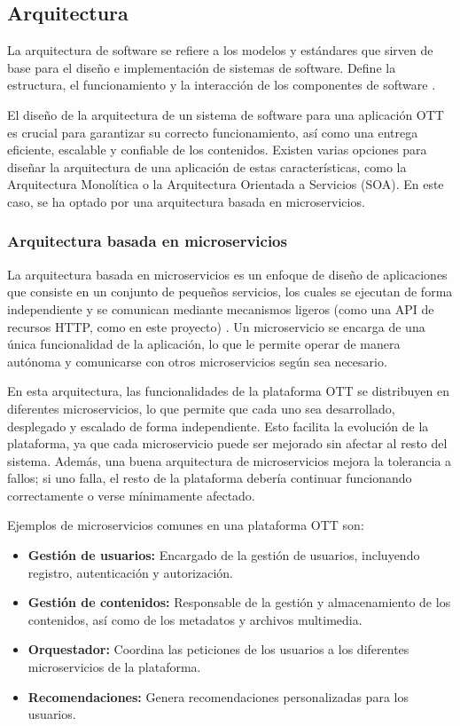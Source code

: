 \subsection{Arquitectura}
\label{subsec:fundamentos_teoricos_arquitectura}

La arquitectura de software se refiere a los modelos y estándares que sirven de base para el diseño e 
implementación de sistemas de software. Define la estructura, el funcionamiento y la interacción de los 
componentes de software \cite{ArqSoftware}.

El diseño de la arquitectura de un sistema de software para una aplicación OTT es crucial para garantizar 
su correcto funcionamiento, así como una entrega eficiente, escalable y confiable de los contenidos. 
Existen varias opciones para diseñar la arquitectura de una aplicación de estas características, como 
la Arquitectura Monolítica o la Arquitectura Orientada a Servicios (SOA). En este caso, se ha optado por 
una arquitectura basada en microservicios.

\subsubsection{Arquitectura basada en microservicios}
\label{subsec:fundamentos_teoricos_arquitectura_microservicios}

La arquitectura basada en microservicios es un enfoque de diseño de aplicaciones que consiste en un conjunto 
de pequeños servicios, los cuales se ejecutan de forma independiente y se comunican mediante mecanismos 
ligeros (como una API de recursos HTTP, como en este proyecto) \cite{Microservices}. Un microservicio se 
encarga de una única funcionalidad de la aplicación, lo que le permite operar de manera autónoma y comunicarse 
con otros microservicios según sea necesario.

En esta arquitectura, las funcionalidades de la plataforma OTT se distribuyen en diferentes microservicios, 
lo que permite que cada uno sea desarrollado, desplegado y escalado de forma independiente. Esto facilita 
la evolución de la plataforma, ya que cada microservicio puede ser mejorado sin afectar al resto del sistema. 
Además, una buena arquitectura de microservicios mejora la tolerancia a fallos; si uno falla, el resto de la 
plataforma debería continuar funcionando correctamente o verse mínimamente afectado.

Ejemplos de microservicios comunes en una plataforma OTT son:
\begin{itemize}
\item \textbf{Gestión de usuarios:} Encargado de la gestión de usuarios, incluyendo registro, autenticación y autorización.
\item \textbf{Gestión de contenidos:} Responsable de la gestión y almacenamiento de los contenidos, así como de los metadatos y archivos multimedia.
\item \textbf{Orquestador:} Coordina las peticiones de los usuarios a los diferentes microservicios de la plataforma.
\item \textbf{Recomendaciones:} Genera recomendaciones personalizadas para los usuarios.
\end{itemize}

